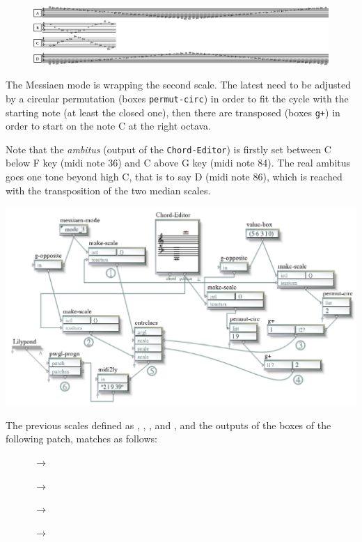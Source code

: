 \begin{figure}[htbp]
\begin{center}
\includegraphics[width=\textwidth]{mp/img/scale}
\end{center}
\end{figure}

The Messiaen mode is wrapping the second scale. The latest need to be adjusted by a circular permutation (boxes \texttt{permut-circ}) in order to fit the cycle with the starting note (at least the closed one), then there are transposed (boxes \texttt{g+}) in order to start on the note C at the right octava. 

Note that the \textit{ambitus} (output of the \texttt{Chord-Editor}) is firstly set between C below F key (midi note 36) and C above G key (midi note 84). The real ambitus goes one tone beyond high C, that is to say D (midi note 86), which is reached with the transposition of the two median scales.

{
\begin{center}
\includegraphics[width=\textwidth]{mp/img/patch}
\end{center}
} 

The previous scales defined as \textcolor{gray}{}, \textcolor{gray}{}, \textcolor{gray}{}, and \textcolor{gray}{}, and the outputs of the boxes of the following patch, matches as follows:

\begin{description}
\item[ ] \textcolor{gray}{} $\rightarrow$ \textcolor{gray}{}
\item[ ] \textcolor{gray}{} $\rightarrow$ \textcolor{gray}{}
\item[ ] \textcolor{gray}{} $\rightarrow$ \textcolor{gray}{}
\item[ ] \textcolor{gray}{} $\rightarrow$ \textcolor{gray}{}
\end{description}

